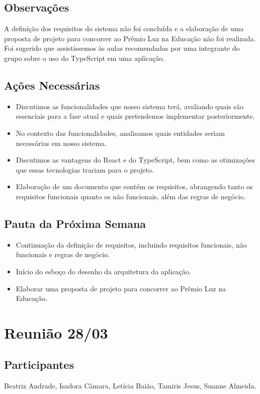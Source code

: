 \begin{apendicesenv}
\subsection*{Observações}
A definição dos requisitos do sistema não foi concluída e a elaboração de uma proposta de projeto para concorrer ao Prêmio Luz na Educação não foi realizada.
Foi sugerido que assistíssemos às aulas recomendadas por uma integrante do grupo sobre o uso do TypeScript em uma aplicação.

\subsection*{Ações Necessárias}
\begin{itemize}
    \item Discutimos as funcionalidades que nosso sistema terá, avaliando quais são essenciais para a fase atual e quais pretendemos implementar posteriormente.
    \item No contexto das funcionalidades, analisamos quais entidades seriam necessárias em nosso sistema.
    \item Discutimos as vantagens do React e do TypeScript, bem como as otimizações que essas tecnologias trariam para o projeto.
    \item Elaboração de um documento que contém os requisitos, abrangendo tanto os requisitos funcionais quanto os não funcionais, além das regras de negócio.
\end{itemize}

\subsection*{Pauta da Próxima Semana}
\begin{itemize}
    \item Continuação da definição de requisitos, incluindo requisitos funcionais, não funcionais e regras de negócio.
    \item Início do esboço do desenho da arquitetura da aplicação.
    \item Elaborar uma proposta de projeto para concorrer ao Prêmio Luz na Educação.
\end{itemize}

\section*{Reunião 28/03}

\subsection*{Participantes}
Beatriz Andrade, Isadora Câmara, Letícia Baião, Tamiris Jesus, Suanne Almeida.


\end{apendicesenv}
